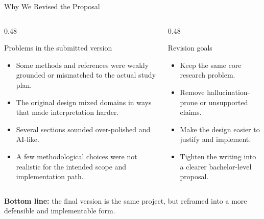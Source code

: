 \documentclass[aspectratio=169,11pt]{beamer}
\begin{document}
\begin{frame}{Why We Revised the Proposal}
\footnotesize
\begin{columns}[T]
\begin{column}{0.48\textwidth}
\begin{alertblock}{Problems in the submitted version}
\begin{itemize}
\item Some methods and references were weakly grounded or mismatched to the actual study plan.
\item The original design mixed domains in ways that made interpretation harder.
\item Several sections sounded over-polished and AI-like.
\item A few methodological choices were not realistic for the intended scope and implementation path.
\end{itemize}
\end{alertblock}
\end{column}
\begin{column}{0.48\textwidth}
\begin{exampleblock}{Revision goals}
\begin{itemize}
\item Keep the same core research problem.
\item Remove hallucination-prone or unsupported claims.
\item Make the design easier to justify and implement.
\item Tighten the writing into a clearer bachelor-level proposal.
\end{itemize}
\end{exampleblock}
\end{column}
\end{columns}

\vspace{0.08cm}
{\footnotesize\color{umgray}\textbf{Bottom line:} the final version is the same project, but reframed into a more defensible and implementable form.}
\end{frame}
\end{document}
